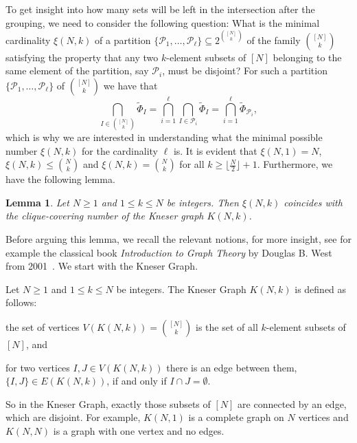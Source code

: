 \documentclass[a4paper,11pt,reqno,english]{amsart}
\theoremstyle{plain}
\newtheorem{lemma}[theorem]{Lemma}
\theoremstyle{definition}
\begin{document}
\medskip
To get insight into how many sets will be left in the intersection after the grouping, we need to consider the following question:
What is the minimal cardinality $\xi(N,k)$ of a partition $\{\mathcal{P}_1,\dots,\mathcal{P}_{\ell}\} \subseteq 2^{\binom{[N]}{k}}$ of the family $\binom{[N]}{k}$ satisfying the property that any two $k$-element subsets of $[N]$ belonging to the same element of the partition, say $\mathcal{P}_i$, must be disjoint?
For such a partition $\{\mathcal{P}_1,\dots,\mathcal{P}_{\ell}\}$ of $\binom{[N]}{k}$ we have that
\begin{equation}\label{eq:BestReplyIntersection}
	\bigcap_{I\in \binom{[N]}{k}}\widetilde{\Phi}_I=\bigcap_{i=1}^{\ell}\bigcap_{I\in\mathcal{P}_i}\widetilde{\Phi}_{I}=\bigcap_{i=1}^{\ell} \widetilde{\Phi}_{\mathcal{P}_i},
\end{equation}
which is why we are interested in understanding what the minimal possible number $\xi(N,k)$ for the cardinality $\ell$ is.
It is evident that $\xi(N,1)=N$,  $\xi(N,k)\leq \binom{N}{k}$ and $\xi(N,k)= \binom{N}{k}$ for all $k\geq \lfloor\frac{N}{2}\rfloor+1$.
Furthermore, we have the following lemma.

\begin{lemma}\label{lem:value_of_xi}
	Let $N\geq 1$ and $1\leq k\leq N$ be integers.
	Then $\xi(N,k)$ coincides with the clique-covering number of the Kneser graph $K(N,k)$.
\end{lemma}

\medskip
Before arguing this lemma, we recall the relevant notions, for more insight, see for example the classical book \textit{Introduction to Graph Theory} by Douglas B. West from 2001~\cite[Def. 5.3.18]{DouglasWest2001}. We start with the Kneser Graph.

\medskip
Let $N\geq 1$ and $1\leq k\leq N$ be integers.
The Kneser Graph $K(N,k)$ is defined as follows:
\begin{compactitem}[\quad --]
	\item the set of vertices $V(K(N,k)) = \binom{[N]}{k}$ is the set of all $k$-element subsets of $[N]$, and
	\item for two vertices $I,J\in V(K(N,k))$ there is an edge between them, $\{I,J\}\in E(K(N,k))$, if and only if $I\cap J = \emptyset$.
\end{compactitem}
So in the Kneser Graph, exactly those subsets of $[N]$ are connected by an edge, which are disjoint.
For example, $K(N,1)$ is a complete graph on $N$ vertices and $K(N,N)$ is a graph with one vertex and no edges.
\end{document}
